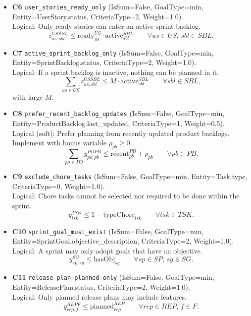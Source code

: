 \documentclass[11pt,a4paper]{article}
\begin{document}
\begin{itemize}[leftmargin=2.2em]
  \item \textbf{C6} \texttt{user\_stories\_ready\_only} (IsSum=False, GoalType=min, Entity=UserStory.status, CriteriaType=2, Weight=1.0). \\
  Logical: Only ready stories can enter an active sprint backlog. \\
  \[
  z^{US SBL}_{us,sbl} \le \text{ready}^{US}_{us}\cdot \text{active}^{SBL}_{sbl} \qquad \forall us\in US,\, sbl\in SBL.
  \]

  \item \textbf{C7} \texttt{active\_sprint\_backlog\_only} (IsSum=False, GoalType=min, Entity=SprintBacklog.status, CriteriaType=2, Weight=1.0). \\
  Logical: If a sprint backlog is inactive, nothing can be planned in it. \\
  \[
  \sum_{us\in US} z^{US SBL}_{us,sbl} \le M\cdot \text{active}^{SBL}_{sbl} \qquad \forall sbl\in SBL,
  \]
  with large $M$.

  \item \textbf{C8} \texttt{prefer\_recent\_backlog\_updates} (IsSum=False, GoalType=min, Entity=ProductBacklog.last\_updated, CriteriaType=1, Weight=0.5). \\
  Logical (soft): Prefer planning from recently updated product backlogs. Implement with bonus variable $\rho_{pb}\ge0$. \\
  \[
  \sum_{po\in PO} y^{PO PB}_{po,pb} \le \text{recent}^{PB}_{pb} + \rho_{pb} \qquad \forall pb\in PB.
  \]

  \item \textbf{C9} \texttt{exclude\_chore\_tasks} (IsSum=False, GoalType=min, Entity=Task.type, CriteriaType=0, Weight=1.0). \\
  Logical: Chore tasks cannot be selected nor required to be done within the sprint. \\
  \[
  y^{TSK}_{tsk} \le 1-\text{typeChore}_{tsk} \qquad \forall tsk\in TSK.
  \]

  \item \textbf{C10} \texttt{sprint\_goal\_must\_exist} (IsSum=False, GoalType=min, Entity=SprintGoal.objective\_description, CriteriaType=2, Weight=1.0). \\
  Logical: A sprint may only adopt goals that have an objective. \\
  \[
  y^{SG}_{sp,sg} \le \text{hasObj}_{sg} \qquad \forall sp\in SP,\, sg\in SG.
  \]

  \item \textbf{C11} \texttt{release\_plan\_planned\_only} (IsSum=False, GoalType=min, Entity=ReleasePlan.status, CriteriaType=2, Weight=1.0). \\
  Logical: Only planned release plans may include features. \\
  \[
  y^{REP F}_{rep,f} \le \text{planned}^{REP}_{rep} \qquad \forall rep\in REP,\, f\in F.
  \]
\end{itemize}
\end{document}
